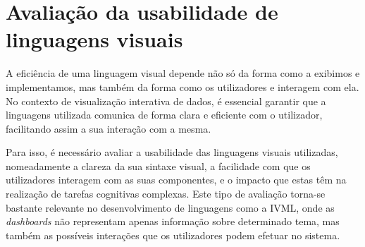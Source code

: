 

\section{Avaliação da usabilidade de linguagens visuais} %
\label{sec:avaliacao_usabilidade}

A eficiência de uma linguagem visual depende não só da forma como a exibimos e implementamos, mas também da forma como os utilizadores e interagem com ela. No contexto de visualização interativa de dados, é essencial garantir que a linguagens utilizada comunica de forma clara e eficiente com o utilizador, facilitando assim a sua interação com a mesma. 

Para isso, é necessário avaliar a usabilidade das linguagens visuais utilizadas, nomeadamente a clareza da sua sintaxe visual, a facilidade com que os utilizadores interagem com as suas componentes, e o impacto que estas têm na realização de tarefas cognitivas complexas. Este tipo de avaliação torna-se bastante relevante no desenvolvimento de linguagens como a \gls{IVML}, onde as \textit{dashboards} não representam apenas informação sobre determinado tema, mas também as possíveis interações que os utilizadores podem efetuar no sistema.



